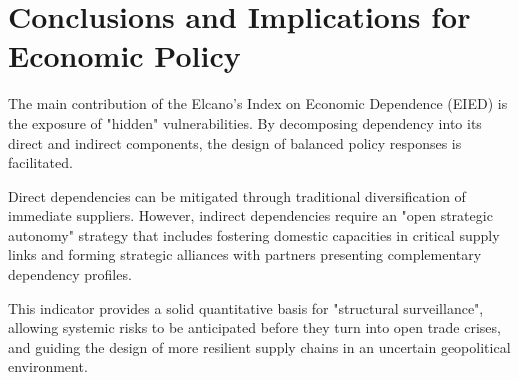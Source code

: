 \documentclass[final,1p,times,authoryear]{elsarticle}
\begin{document}
\section{Conclusions and Implications for Economic Policy}

The main contribution of the Elcano's Index on Economic Dependence (EIED) is the exposure of "hidden" vulnerabilities. By decomposing dependency into its direct and indirect components, the design of balanced policy responses is facilitated.

Direct dependencies can be mitigated through traditional diversification of immediate suppliers. However, indirect dependencies require an "open strategic autonomy" strategy that includes fostering domestic capacities in critical supply links and forming strategic alliances with partners presenting complementary dependency profiles.

This indicator provides a solid quantitative basis for "structural surveillance", allowing systemic risks to be anticipated before they turn into open trade crises, and guiding the design of more resilient supply chains in an uncertain geopolitical environment.



\end{document}
